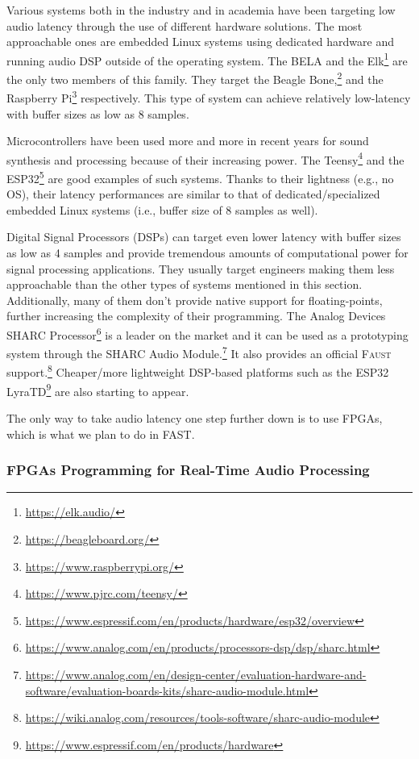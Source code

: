 \documentclass[a4paper,9pt]{extarticle}
\newcommand{\F}{\textsc{Faust}}
\newcommand{\PP}{FAST}
\begin{document}
Various systems both in the industry and in academia have been targeting low audio latency through the use of different hardware solutions. The most approachable ones are embedded Linux systems using dedicated hardware and running audio DSP outside of the operating system. The BELA \cite{mcpherson2015} and the Elk\footnote{\url{https://elk.audio/}} are the only two members of this family. They target the  Beagle Bone,\footnote{\url{https://beagleboard.org/}} and the Raspberry Pi\footnote{\url{https://www.raspberrypi.org/}} respectively. This type of system can achieve relatively low-latency with buffer sizes as low as 8 samples.

Microcontrollers have been used more and more in recent years for sound synthesis and processing because of their increasing power. The Teensy\footnote{\url{https://www.pjrc.com/teensy/}} \cite{Michon2019} and the ESP32\footnote{\url{https://www.espressif.com/en/products/hardware/esp32/overview}} \cite{Michon2020} are good examples of such systems. Thanks to their lightness (e.g., no OS), their latency performances are similar to that of dedicated/specialized embedded Linux systems (i.e., buffer size of 8 samples as well).  

Digital Signal Processors (DSPs) can target even lower latency with buffer sizes as low as 4 samples and provide tremendous amounts of computational power for signal processing applications. They usually target engineers making them less approachable than the other types of systems mentioned in this section. Additionally, many of them don't provide native support for floating-points, further increasing the complexity of their programming. The Analog Devices SHARC Processor\footnote{\url{https://www.analog.com/en/products/processors-dsp/dsp/sharc.html}} is a leader on the market and it can be used as a prototyping system through the SHARC Audio Module.\footnote{\url{https://www.analog.com/en/design-center/evaluation-hardware-and-software/evaluation-boards-kits/sharc-audio-module.html}} It also provides an official \F{} support.\footnote{\url{https://wiki.analog.com/resources/tools-software/sharc-audio-module}} Cheaper/more lightweight DSP-based platforms such as the ESP32 LyraTD\footnote{\url{https://www.espressif.com/en/products/hardware}} are also starting to appear.

The only way to take audio latency one step further down is to use FPGAs, which is what we plan to do in \PP{}.

\subsubsection{FPGAs Programming for  Real-Time Audio Processing}
\end{document}
